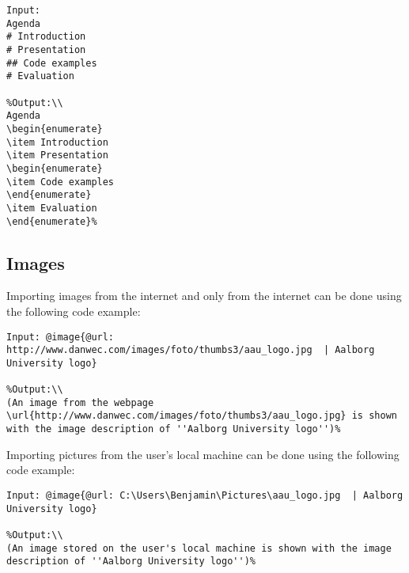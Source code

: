 \begin{lstlisting}[frame=single]
Input:
Agenda
# Introduction
# Presentation
## Code examples
# Evaluation

%Output:\\
Agenda
\begin{enumerate}
\item Introduction
\item Presentation
\begin{enumerate}
\item Code examples
\end{enumerate}
\item Evaluation
\end{enumerate}%
\end{lstlisting}


\subsection{Images}
Importing images from the internet and only from the internet can be done using the following code example:
\begin{lstlisting}[frame=single]
Input: @image{@url: http://www.danwec.com/images/foto/thumbs3/aau_logo.jpg  | Aalborg University logo}

%Output:\\
(An image from the webpage \url{http://www.danwec.com/images/foto/thumbs3/aau_logo.jpg} is shown with the image description of ''Aalborg University logo'')%
\end{lstlisting}
Importing pictures from the user's local machine can be done using the following code example:
\begin{lstlisting}[frame=single]
Input: @image{@url: C:\Users\Benjamin\Pictures\aau_logo.jpg  | Aalborg University logo}

%Output:\\
(An image stored on the user's local machine is shown with the image description of ''Aalborg University logo'')%
\end{lstlisting}

